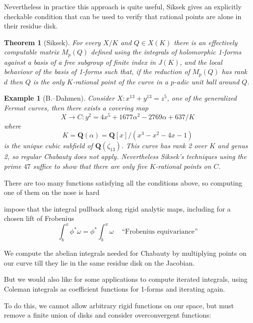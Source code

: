 \documentclass[oneside,11pt,]{article}
\newtheorem*{theorem*}{Theorem}
\newtheorem*{example*}{Example}
\newcommand{\QQ}{\mathbf{Q}}
\let\emph\relax %
\begin{document}
Nevertheless in practice this approach is quite useful, Siksek gives an explicitly checkable condition that can be used to verify that rational points are alone in their residue disk.

\begin{theorem*}[Siksek]
    For every $X/K$ and $Q \in X(K)$ there is an effectively computable matrix $M_p(Q)$ defined using the integrals of holomorphic 1-forms against a basis of a free subgroup of finite index in $J(K)$, and the local behaviour of the basis of 1-forms such that, if the reduction of $M_p(Q)$ has rank $d$ then $Q$ is the only $K$-rational point of the curve in a $p$-adic unit ball around $Q$.
\end{theorem*}

\begin{example*}[B.--Dahmen]
    Consider \(X\colon  x^{13} + y^{13} = z^5\), one of the generalized Fermat curves, then there exists a covering map
    \[X \to C \colon y^2 = 4 x^5 + 1677 \alpha^2 - 2769 \alpha + 637/K\]
    where
    \[K = \QQ(\alpha ) = \QQ[x]/(x^{3} - x^{2} - 4 x - 1)\]
    is the unique cubic subfield of $\QQ(\zeta _{13})$.
    This curve has rank 2 over $K$ and genus 2, so regular Chabauty does not apply.
    Nevertheless Siksek's techniques using the prime $47$ suffice to show that there are only five $K$-rational points on $C$.
\end{example*}

\emph{Problem:} There are too many functions satisfying all the conditions above, so computing one of them on the nose is hard

\emph{Coleman's idea:} impose that the integral pullback along rigid analytic maps, including for a chosen lift of Frobenius
\[\int_b^x \phi^*\omega = \phi^*\int_b^x \omega\,\quad\text{``Frobenius equivariance''}\]%

We \emph{can} compute the abelian integrals needed for Chabauty by multiplying points on our curve till they lie in the same residue disk on the Jacobian.

But we would also like for some applications to compute iterated integrals, using Coleman integrals as coefficient functions for 1-forms and iterating again.

To do this, we cannot allow arbitrary rigid functions on our space, but must remove a finite union of disks and consider overconvergent functions:
\end{document}
